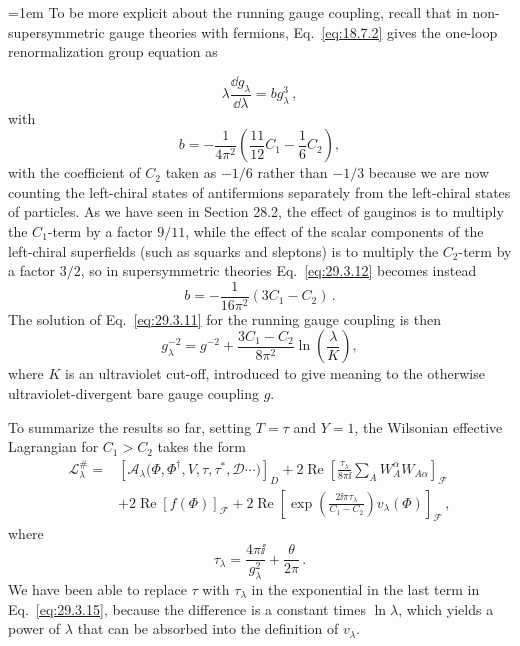 \begingroup
\emergencystretch=1em
To be more explicit about the running gauge coupling, recall that in
non-super\-sym\-met\-ric gauge theories with fermions,
Eq.~\eqref{eq:18.7.2}
gives the one-loop renormalization group equation as
\par
\endgroup
\begin{equation}
  \lambda\frac{\dd g_\lambda}{\dd\lambda}=bg_\lambda^3\,,
  \tag{29.3.11}\label{eq:29.3.11}
\end{equation}
with
\begin{equation}
  b=-\frac{1}{4\pi^2}
  \left(\frac{11}{12}C_1-\frac16 C_2\right),
  \tag{29.3.12}\label{eq:29.3.12}
\end{equation}
with the coefficient of \(C_2\) taken as \(-1/6\) rather than \(-1/3\)
because we are now counting the left-chiral states of antifermions
separately from the left-chiral states of particles. As we have seen in
Section 28.2, the effect of gauginos is to multiply the \(C_1\)-term by a
factor \(9/11\), while the effect of the scalar components of the
left-chiral superfields (such as squarks and sleptons) is to multiply the
\(C_2\)-term by a factor \(3/2\), so in supersymmetric theories
Eq.~\eqref{eq:29.3.12} becomes instead
\begin{equation}
  b=-\frac{1}{16\pi^2}(3C_1-C_2)\,.
  \tag{29.3.13}\label{eq:29.3.13}
\end{equation}
The solution of Eq.~\eqref{eq:29.3.11} for the running gauge coupling is
then
\begin{equation}
  g_\lambda^{-2}
  =
  g^{-2}
  +\frac{3C_1-C_2}{8\pi^2}\ln\left(\frac{\lambda}{K}\right),
  \tag{29.3.14}\label{eq:29.3.14}
\end{equation}
where \(K\) is an ultraviolet cut-off, introduced to give meaning to the
otherwise ultraviolet-divergent bare gauge coupling \(g\).

To summarize the results so far, setting \(T=\tau\) and \(Y=1\), the
Wilsonian effective Lagrangian for \(C_1>C_2\) takes the form
\begin{equation}
  \begin{aligned}
  \mathcal{L}^{\#}_\lambda
  ={}&
  \left[
    \mathcal{A}_\lambda
    \bigl(\Phi,\Phi^\dagger,V,\tau,\tau^*,\mathcal{D}\cdots\bigr)
  \right]_D
  +2\operatorname{Re}
  \left[
    \frac{\tau_\lambda}{8\pi \ii}
    \sum_AW_A^\alpha W_{A\alpha}
  \right]_{\mathcal{F}}
  \\
  &+2\operatorname{Re}\left[f(\Phi)\right]_{\mathcal{F}}
  +2\operatorname{Re}\left[
    \exp\left(\frac{2\ii\pi\tau_\lambda}{C_1-C_2}\right)
    v_\lambda(\Phi)
  \right]_{\mathcal{F}}\,,
  \end{aligned}
  \tag{29.3.15}\label{eq:29.3.15}
\end{equation}
where
\begin{equation}
  \tau_\lambda=\frac{4\pi \ii}{g_\lambda^2}+\frac{\theta}{2\pi}\,.
  \tag{29.3.16}\label{eq:29.3.16}
\end{equation}
We have been able to replace \(\tau\) with \(\tau_\lambda\) in the
exponential in the last term in Eq.~\eqref{eq:29.3.15}, because the
difference is a constant times \(\ln\lambda\), which yields a power of
\(\lambda\) that can be absorbed into the definition of \(v_\lambda\).

